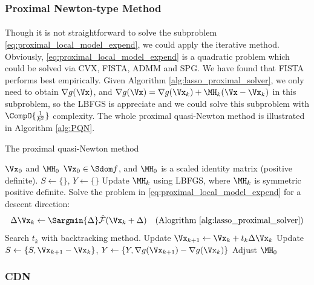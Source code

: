 \documentclass[
10pt, %
a4paper, %
oneside, %
headinclude,footinclude, %
BCOR5mm, %
]{scrartcl}
\begin{document}
\subsubsection{Proximal Newton-type Method}
\paragraph{}
Though it is not straightforward to solve the subproblem 
\eqref{eq:proximal_local_model_expend}, we could apply the iterative method. 
Obviously, \eqref{eq:proximal_local_model_expend} is a quadratic problem which 
could be solved via CVX, FISTA, ADMM and SPG. We have found that FISTA performs 
best empirically. Given Algorithm \ref{alg:lasso_proximal_solver}, we only need 
to obtain $\nabla g(\Vx)$, and 
$ \nabla g(\Vx) = \nabla g(\Vx_k) + \MH_k(\Vx - \Vx_k) $ 
in this subproblem, so the LBFGS is appreciate and we could solve this 
subproblem with $\CompO{\frac{1}{k^2}} $ complexity. The whole proximal 
quasi-Newton method is illustrated in Algorithm \ref{alg:PQN}.

\begin{algorithm}[ht]
\caption{The proximal quasi-Newton method}\label{alg:PQN}
\begin{algorithmic}[1]
\Require $ \Vx_0$ and $\MH_0$
\Ensure  $ \Vx_0 \in \Sdom f$, and $\MH_0 $ is a scaled identity matrix 
(positive definite).
\State $ S \gets \{\} $, $ Y \gets \{\} $ 
\Repeat
\State Update $ \MH_k $ using LBFGS, where $ \MH_k $ is symmetric positive  
definite.
\State Solve the problem in \eqref{eq:proximal_local_model_expend} for a 
descent direction:
\begin{equation*}
	\Delta \Vx_k \gets \Sargmin{\Delta} \hat{\mathcal{F}}(\Vx_k+ \Delta) 		
    \text{\quad (Alogrithm~\ref{alg:lasso_proximal_solver})}
\end{equation*}
\State Search $ t_k $ with backtracking method.
\State Update $ \Vx_{k+1} \gets \Vx_k + t_k \Delta \Vx_k $
\State Update $ S \gets \{S, \Vx_{k+1} - \Vx_{k}\} $, $ Y \gets \{Y, \nabla 
	g(\Vx_{k+1}) - \nabla g(\Vx_k)\}  $
\State  Adjust $ \MH_0 $
\EndIf
{}
\end{algorithmic}
\end{algorithm}

\subsubsection{CDN} 
\end{document}
